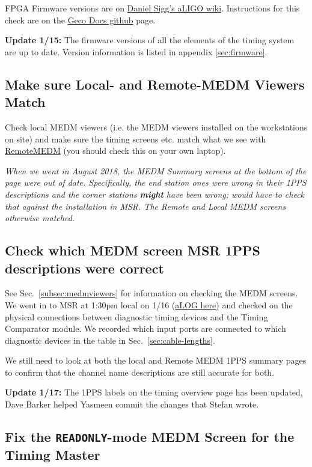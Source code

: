 \documentclass{article}
\newcommand*{\TODO}{\textcolor{todo}}
\begin{document}
FPGA Firmware versions are on \href{https://awiki.ligo-wa.caltech.edu/wiki/TimingFpgaCode}{Daniel Sigg's aLIGO wiki}. Instructions for this check are on the \href{https://github.com/stefco/geco_docs/blob/master/3-timing-fpga-code.md}{Geco Docs github} page.

\textbf{Update 1/15:} The firmware versions of all the elements of the timing system are up to date. Version information is listed in appendix \ref{sec:firmware}.

\TODO{
\subsection{\label{subsec:medmviewers} Make sure Local- and Remote-MEDM Viewers Match}
}
Check local MEDM viewers (i.e. the MEDM viewers installed on the workstations on site) and make sure the timing screens etc. match what we see with \href{https://wiki.ligo.org/RemoteAccess/RemoteEPICS}{RemoteMEDM} (you should check this on your own laptop).

\textit{When we went in August 2018, the MEDM Summary screens at the bottom of the page were out of date. Specifically, the end station ones were wrong in their 1PPS descriptions and the corner stations \textbf{might} have been wrong; would have to check that against the installation in MSR. The Remote and Local MEDM screens otherwise matched.}

\TODO{
\subsection{Check which MEDM screen MSR 1PPS descriptions were correct}
}
See Sec.~\ref{subsec:medmviewers} for information on checking the MEDM screens. We went in to MSR at 1:30pm local on 1/16 (\href{https://alog.ligo-wa.caltech.edu/aLOG/index.php?callRep=46477}{aLOG here}) and checked on the physical connections between diagnostic timing devices and the Timing Comparator module. We recorded which input ports are connected to which diagnostic devices in the table in Sec.~\ref{sec:cable-lengths}.

\TODO{We still need to look at both the local and Remote MEDM 1PPS summary pages to confirm that the channel name descriptions are still accurate for both.} 

\textbf{Update 1/17:} The 1PPS labels on the timing overview page has been updated, Dave Barker helped Yasmeen commit the changes that Stefan wrote. 

\TODO{
\subsection{\label{sec:fix-local-medm-readonly}Fix the \texttt{READONLY}-mode MEDM Screen for the Timing Master}
}
\end{document}
